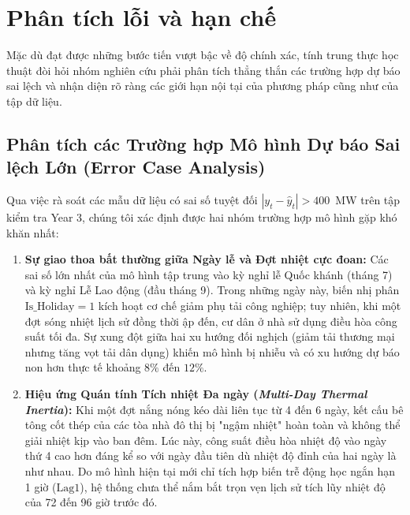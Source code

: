 \section{Phân tích lỗi và hạn chế}
\label{sec:limitations}

Mặc dù đạt được những bước tiến vượt bậc về độ chính xác, tính trung thực học thuật đòi hỏi nhóm nghiên cứu phải phân tích thẳng thắn các trường hợp dự báo sai lệch và nhận diện rõ ràng các giới hạn nội tại của phương pháp cũng như của tập dữ liệu.

\subsection{Phân tích các Trường hợp Mô hình Dự báo Sai lệch Lớn (Error Case Analysis)}
Qua việc rà soát các mẫu dữ liệu có sai số tuyệt đối $|y_t - \hat{y}_t| > 400$~MW trên tập kiểm tra Year 3, chúng tôi xác định được hai nhóm trường hợp mô hình gặp khó khăn nhất:

\begin{enumerate}
    \item \textbf{Sự giao thoa bất thường giữa Ngày lễ và Đợt nhiệt cực đoan:}
    Các sai số lớn nhất của mô hình tập trung vào kỳ nghỉ lễ Quốc khánh (tháng 7) và kỳ nghỉ Lễ Lao động (đầu tháng 9). Trong những ngày này, biến nhị phân $\text{Is\_Holiday} = 1$ kích hoạt cơ chế giảm phụ tải công nghiệp; tuy nhiên, khi một đợt sóng nhiệt lịch sử đồng thời ập đến, cư dân ở nhà sử dụng điều hòa công suất tối đa. Sự xung đột giữa hai xu hướng đối nghịch (giảm tải thương mại nhưng tăng vọt tải dân dụng) khiến mô hình bị nhiễu và có xu hướng dự báo non hơn thực tế khoảng $8\%$ đến $12\%$.
    \item \textbf{Hiệu ứng Quán tính Tích nhiệt Đa ngày (\textit{Multi-Day Thermal Inertia}):}
    Khi một đợt nắng nóng kéo dài liên tục từ 4 đến 6 ngày, kết cấu bê tông cốt thép của các tòa nhà đô thị bị "ngậm nhiệt" hoàn toàn và không thể giải nhiệt kịp vào ban đêm. Lúc này, công suất điều hòa nhiệt độ vào ngày thứ 4 cao hơn đáng kể so với ngày đầu tiên dù nhiệt độ đỉnh của hai ngày là như nhau. Do mô hình hiện tại mới chỉ tích hợp biến trễ động học ngắn hạn 1 giờ ($\text{Lag1}$), hệ thống chưa thể nắm bắt trọn vẹn lịch sử tích lũy nhiệt độ của 72 đến 96 giờ trước đó.
\end{enumerate}

